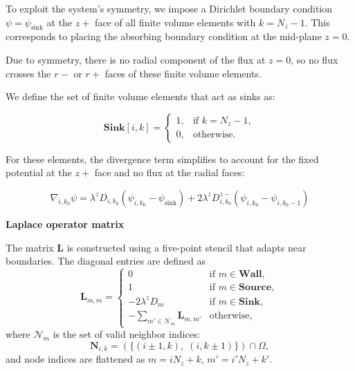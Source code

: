 \documentclass[10pt, a4paper, twocolumn]{article}
\begin{document}
To exploit the system's symmetry, we impose a Dirichlet boundary condition $\psi = \psi_{\text{sink}}$ at the $z+$ face of all finite volume elements with $k = N_z - 1$.
This corresponds to placing the absorbing boundary condition at the mid-plane $z = 0$.

Due to symmetry, there is no radial component of the flux at $z = 0$, so no flux crosses the $r-$ or $r+$ faces of these finite volume elements.

We define the set of finite volume elements that act as sinks as:

\begin{equation}
    \textbf{Sink}[i,k] =
    \begin{cases}
    1, & \text{if } k = N_z - 1, \\
    0, & \text{otherwise}.
    \end{cases}
\end{equation}

For these elements, the divergence term simplifies to account for the fixed potential at the $z+$ face and no flux at the radial faces:

\begin{equation}
\nabla_{i,k_0} \psi =
\lambda^{z} D_{i,k_0} (\psi_{i,k_0} - \psi_{\text{sink}})
+ 2 \lambda^{z} D_{i,k_0}^{z-} (\psi_{i,k_0} - \psi_{i,k_0-1})
\end{equation}


\textbf{Laplace operator matrix}

The matrix $\mathbf{L}$ is constructed using a five-point stencil that adapts near boundaries.
The diagonal entries are defined as
\begin{equation}
  \bm{L}_{m,m} = 
  \begin{cases}
    0 & \text{if } m \in \textbf{Wall}, \\
    1 & \text{if } m \in \textbf{Source}, \\
    - 2 \lambda^{z} D_m & \text{if } m \in \textbf{Sink}, \\
    -\!\!\!\sum\limits_{m' \in \mathcal{N}_m} \bm{L}_{m, m'} & \text{otherwise},
  \end{cases}
  \label{eq:L_diag}
\end{equation}
where $\mathcal{N}_m$ is the set of valid neighbor indices:
\begin{equation}
  \textbf{N}_{i,k} = \left( \{(i \pm 1, k),\; (i, k \pm 1)\} \right) \cap \Omega,
  \label{eq:neighbors}
\end{equation}
and node indices are flattened as $m = i N_z + k$, $m' = i' N_z + k'$.
\end{document}
